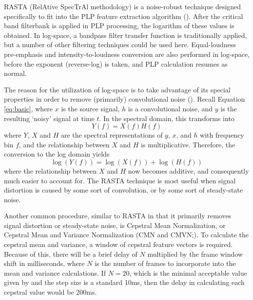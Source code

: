 RASTA (RelAtive SpecTrAl methodology) is a noise-robust technique designed specifically to fit into the PLP feature extraction algorithm (\cite{hermansky:92}).  After the critical band filterbank is applied in PLP processing, the logarithm of these values is obtained.  In log-space, a bandpass filter transfer function is traditionally applied, but a number of other filtering techniques could be used here.  Equal-loudness pre-emphasis and intensity-to-loudness conversion are also performed in log-space, before the exponent (reverse-log) is taken, and PLP calculation resumes as normal.

The reason for the utilization of log-space is to take advantage of its special properties in order to remove (primarily) convolutional noise (\cite{gold:11}).  Recall Equation \ref{eq:basic}, where $x$ is the source signal, $h$ is a convolutional noise, and $y$ is the resulting `noisy' signal at time $t$.  In the spectral domain, this transforms into \begin{equation} Y(f) = X(f)H(f) \end{equation} where $Y$, $X$ and $H$ are the spectral representations of $y$, $x$, and $h$ with frequency bin $f$, and the relationship between $X$ and $H$ is multiplicative.  Therefore, the conversion to the log domain yields \begin{equation} \log(Y(f)) = \log(X(f)) + \log(H(f)) \end{equation} where the relationship between $X$ and $H$ now becomes additive, and consequently much easier to account for.  The RASTA technique is most useful when signal distortion is caused by some sort of convolution, or by some sort of steady-state noise.

Another common procedure, similar to RASTA in that it primarily removes signal distortion or steady-state noise, is Cepstral Mean Normalization, or Cepstral Mean and Variance Normalization (CMN and CMVN;\cite{atal:74,viikki:98}).  To calculate the cepstral mean and variance, a window of cepstral feature vectors is required.  Because of this, there will be a brief delay of $N$ multiplied by the frame window shift in milliseconds, where $N$ is the number of frames to incorporate into the mean and variance calculations.  If $N=20$, which is the minimal acceptable value given by \cite{viikki:98} and the step size is a standard 10ms, then the delay in calculating each cepstral value would be 200ms.

